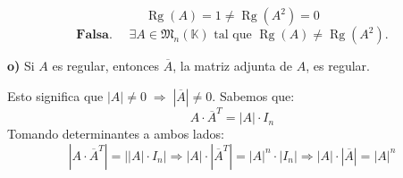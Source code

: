 \documentclass[a4paper,12pt]{article}
\begin{document}
\begin{ejercicio}[title=Ejercicio 42 (⋆)]
\[
\operatorname{Rg}(A) = 1 \neq \operatorname{Rg}(A^2) = 0
\]
\[
\boxed{\textbf{Falsa. }\quad \exists A \in \mathfrak{M}_n(\mathbb{K}) \text{ tal que } \operatorname{Rg}(A) \neq \operatorname{Rg}(A^2).}
\]

\vspace{1em}

\textbf{o)} Si $A$ es regular, entonces $\overline{A}$, la matriz adjunta de $A$, es regular.

\vspace{0.5em}

Esto significa que $|A| \neq 0 \;\Rightarrow\; |\overline{A}| \neq 0$.  
Sabemos que:
\[
A \cdot \overline{A}^T = |A| \cdot I_n
\]
Tomando determinantes a ambos lados:
\[
|A \cdot \overline{A}^T| = \bigl||A| \cdot I_n\bigr|
\Rightarrow
|A| \cdot |\overline{A}^T| = |A|^n \cdot |I_n|
\Rightarrow
|A| \cdot |\overline{A}| = |A|^n
\]
\end{ejercicio}
\end{document}
